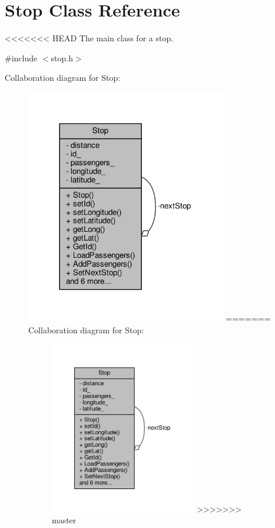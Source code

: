 \hypertarget{classStop}{}\section{Stop Class Reference}
\label{classStop}


<<<<<<< HEAD
The main class for a stop.  




{\ttfamily \#include $<$stop.\+h$>$}



Collaboration diagram for Stop\+:\nopagebreak
\begin{figure}[H]
\begin{center}
\leavevmode
\includegraphics[width=248pt]{classStop__coll__graph}
=======
Collaboration diagram for Stop\+:
\nopagebreak
\begin{figure}[H]
\begin{center}
\leavevmode
\includegraphics[width=181pt]{classStop__coll__graph}
>>>>>>> master
\end{center}
\end{figure}

\end{center}
\end{figure}

